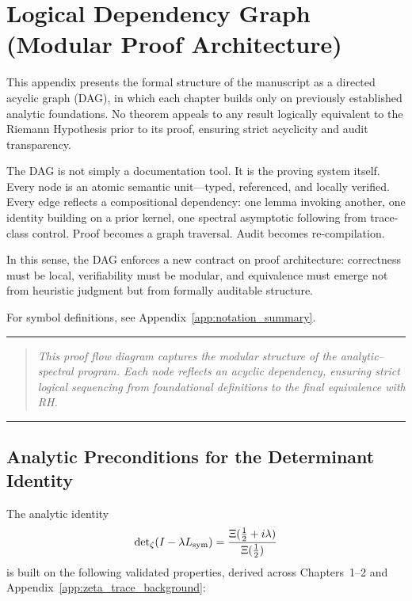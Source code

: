 \section{Logical Dependency Graph (Modular Proof Architecture)}
\label{app:dependency_graph}

\noindent
This appendix presents the formal structure of the manuscript as a directed acyclic graph (DAG), in which each chapter builds only on previously established analytic foundations. No theorem appeals to any result logically equivalent to the Riemann Hypothesis prior to its proof, ensuring strict acyclicity and audit transparency.

The DAG is not simply a documentation tool. It is the proving system itself. Every node is an atomic semantic unit—typed, referenced, and locally verified. Every edge reflects a compositional dependency: one lemma invoking another, one identity building on a prior kernel, one spectral asymptotic following from trace-class control. Proof becomes a graph traversal. Audit becomes re-compilation.

In this sense, the DAG enforces a new contract on proof architecture: correctness must be local, verifiability must be modular, and equivalence must emerge not from heuristic judgment but from formally auditable structure.

For symbol definitions, see Appendix~\ref{app:notation_summary}.

\vspace{1ex}
\hrule
\vspace{1ex}

\begin{quote}
\textit{This proof flow diagram captures the modular structure of the analytic–spectral program. Each node reflects an acyclic dependency, ensuring strict logical sequencing from foundational definitions to the final equivalence with RH.}
\end{quote}

\vspace{1ex}
\hrule
\vspace{2ex}


\subsection*{Analytic Preconditions for the Determinant Identity}
\label{dag:determinant_preconditions}

The analytic identity
\[
\det\nolimits_{\zeta}(I - \lambda L_{\mathrm{sym}}) = \frac{\Xi(\tfrac{1}{2} + i\lambda)}{\Xi(\tfrac{1}{2})}
\]
is built on the following validated properties, derived across Chapters~1–2 and Appendix~\ref{app:zeta_trace_background}:

